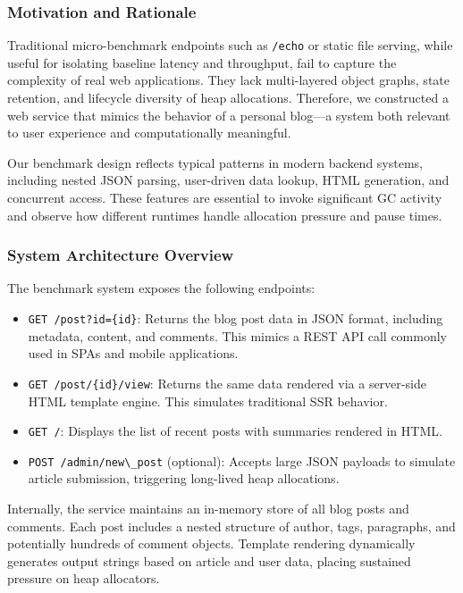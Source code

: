 \subsubsection{Motivation and Rationale}

Traditional micro-benchmark endpoints such as \verb|/echo| or static file serving, while useful for isolating baseline latency and throughput, fail to capture the complexity of real web applications. They lack multi-layered object graphs, state retention, and lifecycle diversity of heap allocations. Therefore, we constructed a web service that mimics the behavior of a personal blog---a system both relevant to user experience and computationally meaningful.

Our benchmark design reflects typical patterns in modern backend systems, including nested JSON parsing, user-driven data lookup, HTML generation, and concurrent access. These features are essential to invoke significant GC activity and observe how different runtimes handle allocation pressure and pause times.

\subsubsection{System Architecture Overview}

The benchmark system exposes the following endpoints:

\begin{itemize}
\item \verb|GET /post?id={id}|: Returns the blog post data in JSON format, including metadata, content, and comments. This mimics a REST API call commonly used in SPAs and mobile applications.
\item \verb|GET /post/{id}/view|: Returns the same data rendered via a server-side HTML template engine. This simulates traditional SSR behavior.
\item \verb|GET /|: Displays the list of recent posts with summaries rendered in HTML.
\item \verb|POST /admin/new\_post| (optional): Accepts large JSON payloads to simulate article submission, triggering long-lived heap allocations.
\end{itemize}

Internally, the service maintains an in-memory store of all blog posts and comments. Each post includes a nested structure of author, tags, paragraphs, and potentially hundreds of comment objects. Template rendering dynamically generates output strings based on article and user data, placing sustained pressure on heap allocators.

